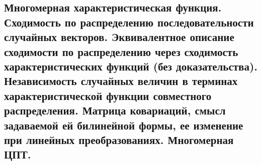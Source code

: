 \subsection{Многомерная характеристическая функция. Сходимость по распределению последовательности случайных векторов. Эквивалентное описание сходимости по распределению через сходимость характеристических функций (без доказательства). Независимость случайных величин в терминах характеристической функции совместного распределения. Матрица ковариаций, смысл задаваемой ей билинейной формы, ее изменение при линейных преобразованиях. Многомерная ЦПТ.}